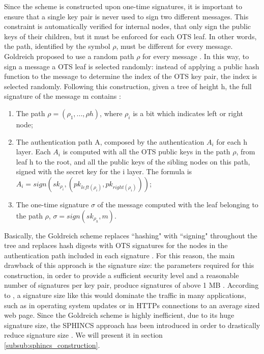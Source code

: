 \documentclass[a4paper,12pt]{article}
\begin{document}
Since the scheme is constructed upon one-time signatures, it is important to ensure that a single key pair is never used to sign two different messages. This constraint is automatically verified for internal nodes, that only sign the public keys of their children, but it must be enforced for each OTS leaf. In other words, the path, identified by the symbol $\rho$, must be different for every message. Goldreich proposed to use a random path $\rho$ for every message \cite{7_hashbased}.
In this way, to sign a message a OTS leaf is selected randomly: instead of applying a public hash function to the message to determine the index of the OTS key pair, the index is selected randomly.
Following this construction, given a tree of height h, the full signature of the message m contains \cite{1_sphincspaper}:
\begin{enumerate}
	\item The path $\rho=(\rho_{1},...,\rho{h})$, where $\rho_{i}$ is a bit which indicates left or right node;
	\item The authentication path A, composed by the authentication $A_{i}$ for each h layer. Each $A_{i}$ is computed with all the OTS public keys in the path $\rho$, from leaf h to the root, and all the public keys of the sibling nodes on this path, signed with the secret key for the i layer. The formula is $A_{i}=sign(sk_{\rho_{i}}, (pk_{left(\rho_{i})},pk_{right(\rho_{i})}))$;
	\item The one-time signature $\sigma$ of the message computed with the leaf belonging to the path $\rho$, $\sigma=sign(sk_{\rho_{h}}, m)$.
\end{enumerate}

Basically, the Goldreich scheme replaces ``hashing" with ``signing" throughout the tree and replaces hash digests with OTS signatures for the nodes in the authentication path included in each signature \cite{8_ARM}. For this reason, the main drawback of this approach is the signature size: the parameters required for this construction, in order to provide a sufficient security level and a reasonable number of signatures per key pair, produce signatures of above 1 MB \cite{4_wings}.
According to \cite{1_sphincspaper}, a signature size like this would dominate the traffic in many applications, such as in operating system updates or in HTTPs connections to an average sized web page.
Since the Goldreich scheme is highly inefficient, due to its huge signature size, the SPHINCS approach has been introduced in order to drastically reduce signature size \cite{1_sphincspaper}. We will present it in section \ref{subsub:sphincs_construction}.
\end{document}
